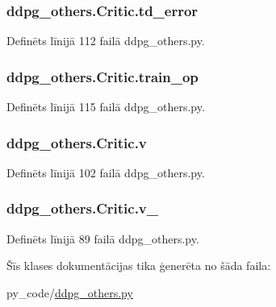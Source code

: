 \subsubsection[{\texorpdfstring{td\+\_\+error}{td_error}}]{\setlength{\rightskip}{0pt plus 5cm}ddpg\+\_\+others.\+Critic.\+td\+\_\+error}\hypertarget{classddpg__others_1_1_critic_acd08db4e575e41c9b40c89aeb70b69fc}{}\label{classddpg__others_1_1_critic_acd08db4e575e41c9b40c89aeb70b69fc}


Definēts līnijā 112 failā ddpg\+\_\+others.\+py.

\subsubsection[{\texorpdfstring{train\+\_\+op}{train_op}}]{\setlength{\rightskip}{0pt plus 5cm}ddpg\+\_\+others.\+Critic.\+train\+\_\+op}\hypertarget{classddpg__others_1_1_critic_a3c9fc0fa915bdd1c961e8a94b60e486f}{}\label{classddpg__others_1_1_critic_a3c9fc0fa915bdd1c961e8a94b60e486f}


Definēts līnijā 115 failā ddpg\+\_\+others.\+py.

\subsubsection[{\texorpdfstring{v}{v}}]{\setlength{\rightskip}{0pt plus 5cm}ddpg\+\_\+others.\+Critic.\+v}\hypertarget{classddpg__others_1_1_critic_a4ea207b84e027e537185c3067f21e8fd}{}\label{classddpg__others_1_1_critic_a4ea207b84e027e537185c3067f21e8fd}


Definēts līnijā 102 failā ddpg\+\_\+others.\+py.

\subsubsection[{\texorpdfstring{v\+\_\+}{v_}}]{\setlength{\rightskip}{0pt plus 5cm}ddpg\+\_\+others.\+Critic.\+v\+\_\+}\hypertarget{classddpg__others_1_1_critic_a44cb021fd77cfeb1515d1421ea1135cd}{}\label{classddpg__others_1_1_critic_a44cb021fd77cfeb1515d1421ea1135cd}


Definēts līnijā 89 failā ddpg\+\_\+others.\+py.



Šīs klases dokumentācijas tika ģenerēta no šāda faila\+:\begin{DoxyCompactItemize}
\item 
py\+\_\+code/\hyperlink{ddpg__others_8py}{ddpg\+\_\+others.\+py}\end{DoxyCompactItemize}
